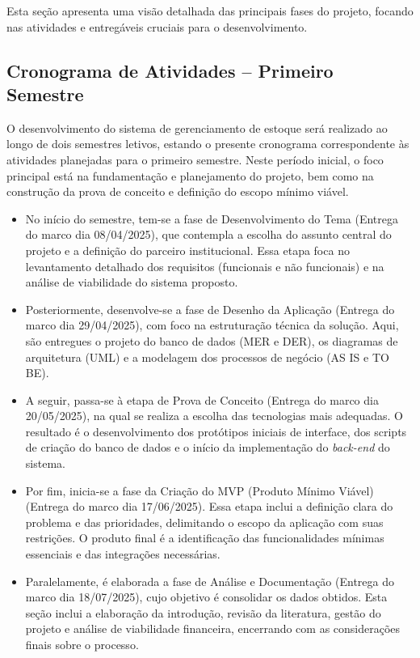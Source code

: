 \documentclass[
	12pt,				%
	openany,			%
	twoside,			%
	a4paper,			%
	english,			%
	brazil				%
	]{abntex2}
\begin{document}
Esta seção apresenta uma visão detalhada das principais fases do projeto, focando nas atividades e entregáveis cruciais para o desenvolvimento.

\subsection{Cronograma de Atividades – Primeiro Semestre}

O desenvolvimento do sistema de gerenciamento de estoque será realizado ao longo de dois semestres letivos, estando o presente cronograma correspondente às atividades planejadas para o primeiro semestre. Neste período inicial, o foco principal está na fundamentação e planejamento do projeto, bem como na construção da prova de conceito e definição do escopo mínimo viável.

\begin{itemize}

\item No início do semestre, tem-se a fase de Desenvolvimento do Tema (Entrega do marco dia 08/04/2025), que contempla a escolha do assunto central do projeto e a definição do parceiro institucional. Essa etapa foca no levantamento detalhado dos requisitos (funcionais e não funcionais) e na análise de viabilidade do sistema proposto.

\item Posteriormente, desenvolve-se a fase de Desenho da Aplicação (Entrega do marco dia 29/04/2025), com foco na estruturação técnica da solução. Aqui, são entregues o projeto do banco de dados (MER e DER), os diagramas de arquitetura (UML) e a modelagem dos processos de negócio (AS IS e TO BE).

\item A seguir, passa-se à etapa de Prova de Conceito (Entrega do marco dia 20/05/2025), na qual se realiza a escolha das tecnologias mais adequadas. O resultado é o desenvolvimento dos protótipos iniciais de interface, dos scripts de criação do banco de dados e o início da implementação do \textit{back-end} do sistema.

\item Por fim, inicia-se a fase da Criação do MVP (Produto Mínimo Viável) (Entrega do marco dia 17/06/2025). Essa etapa inclui a definição clara do problema e das prioridades, delimitando o escopo da aplicação com suas restrições. O produto final é a identificação das funcionalidades mínimas essenciais e das integrações necessárias.

\item Paralelamente, é elaborada a fase de Análise e Documentação (Entrega do marco dia 18/07/2025), cujo objetivo é consolidar os dados obtidos. Esta seção inclui a elaboração da introdução, revisão da literatura, gestão do projeto e análise de viabilidade financeira, encerrando com as considerações finais sobre o processo.
\end{itemize}
\end{document}
